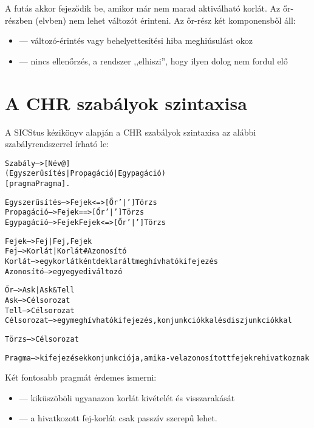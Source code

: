 A futás akkor fejeződik be, amikor már nem marad aktiválható korlát. Az őr-részben
(elvben) nem lehet változót érinteni. Az őr-rész két komponensből áll: 

\begin{itemize}
\item {} --- változó-érintés vagy behelyettesítési hiba meghiúsulást okoz
\item {} --- nincs ellenőrzés, a rendszer ,,elhiszi'', hogy ilyen dolog nem
fordul elő
\end{itemize}

\section{A CHR szabályok szintaxisa}

A SICStus kézikönyv alapján a CHR szabályok szintaxisa az alábbi szabályrendszerrel
írható le:

\begin{alltt}
Szabály       --> [Név @] 
                    (Egyszerűsítés | Propagáció | Egypagáció)
                       [pragma Pragma].

Egyszerűsítés --> Fejek         <=> [Őr '|'] Törzs
Propagáció    --> Fejek         ==> [Őr '|'] Törzs
Egypagáció    --> Fejek \bs Fejek <=> [Őr '|'] Törzs

Fejek         --> Fej | Fej, Fejek
Fej           --> Korlát | Korlát \# Azonosító
Korlát        --> {\rm egy korlátként deklarált meghívható kifejezés}
Azonosító     --> {\rm egy egyedi változó}

Őr            --> Ask | Ask & Tell
Ask           --> Célsorozat
Tell          --> Célsorozat
Célsorozat    --> {\rm egy meghívható kifejezés, konjunkciókkal és diszjunkciókkal}

Törzs         --> Célsorozat

Pragma        --> {\rm kifejezések konjunkciója, amik a -vel azonosított fejekre hivatkoznak}
\end{alltt}

Két fontosabb pragmát érdemes ismerni:

\begin{itemize}
\item {} --- kiküszöböli ugyanazon korlát kivételét és
                   visszarakását
\item {} --- a hivatkozott fej-korlát csak passzív szerepű lehet. 
\end{itemize}

